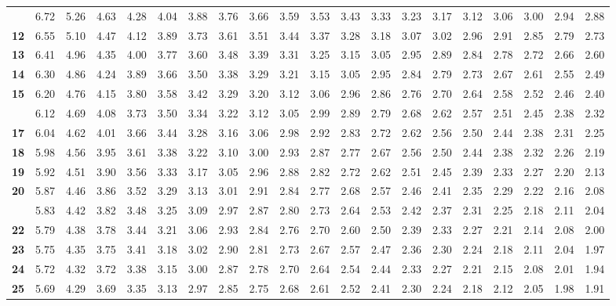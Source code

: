 \documentclass[]{article}
\begin{document}
\begin{landscape}
\begin{longtable}{>{\bfseries}r|rrrrrrrrrrrrrrrrrrr}
\addlinespace
11 & 6.72 & 5.26 & 4.63 & 4.28 & 4.04 & 3.88 & 3.76 & 3.66 & 3.59 & 3.53 & 3.43 & 3.33 & 3.23 & 3.17 & 3.12 & 3.06 & 3.00 & 2.94 & 2.88\\
12 & 6.55 & 5.10 & 4.47 & 4.12 & 3.89 & 3.73 & 3.61 & 3.51 & 3.44 & 3.37 & 3.28 & 3.18 & 3.07 & 3.02 & 2.96 & 2.91 & 2.85 & 2.79 & 2.73\\
13 & 6.41 & 4.96 & 4.35 & 4.00 & 3.77 & 3.60 & 3.48 & 3.39 & 3.31 & 3.25 & 3.15 & 3.05 & 2.95 & 2.89 & 2.84 & 2.78 & 2.72 & 2.66 & 2.60\\
14 & 6.30 & 4.86 & 4.24 & 3.89 & 3.66 & 3.50 & 3.38 & 3.29 & 3.21 & 3.15 & 3.05 & 2.95 & 2.84 & 2.79 & 2.73 & 2.67 & 2.61 & 2.55 & 2.49\\
15 & 6.20 & 4.76 & 4.15 & 3.80 & 3.58 & 3.42 & 3.29 & 3.20 & 3.12 & 3.06 & 2.96 & 2.86 & 2.76 & 2.70 & 2.64 & 2.58 & 2.52 & 2.46 & 2.40\\
\addlinespace
16 & 6.12 & 4.69 & 4.08 & 3.73 & 3.50 & 3.34 & 3.22 & 3.12 & 3.05 & 2.99 & 2.89 & 2.79 & 2.68 & 2.62 & 2.57 & 2.51 & 2.45 & 2.38 & 2.32\\
17 & 6.04 & 4.62 & 4.01 & 3.66 & 3.44 & 3.28 & 3.16 & 3.06 & 2.98 & 2.92 & 2.83 & 2.72 & 2.62 & 2.56 & 2.50 & 2.44 & 2.38 & 2.31 & 2.25\\
18 & 5.98 & 4.56 & 3.95 & 3.61 & 3.38 & 3.22 & 3.10 & 3.00 & 2.93 & 2.87 & 2.77 & 2.67 & 2.56 & 2.50 & 2.44 & 2.38 & 2.32 & 2.26 & 2.19\\
19 & 5.92 & 4.51 & 3.90 & 3.56 & 3.33 & 3.17 & 3.05 & 2.96 & 2.88 & 2.82 & 2.72 & 2.62 & 2.51 & 2.45 & 2.39 & 2.33 & 2.27 & 2.20 & 2.13\\
20 & 5.87 & 4.46 & 3.86 & 3.52 & 3.29 & 3.13 & 3.01 & 2.91 & 2.84 & 2.77 & 2.68 & 2.57 & 2.46 & 2.41 & 2.35 & 2.29 & 2.22 & 2.16 & 2.08\\
\addlinespace
21 & 5.83 & 4.42 & 3.82 & 3.48 & 3.25 & 3.09 & 2.97 & 2.87 & 2.80 & 2.73 & 2.64 & 2.53 & 2.42 & 2.37 & 2.31 & 2.25 & 2.18 & 2.11 & 2.04\\
22 & 5.79 & 4.38 & 3.78 & 3.44 & 3.21 & 3.06 & 2.93 & 2.84 & 2.76 & 2.70 & 2.60 & 2.50 & 2.39 & 2.33 & 2.27 & 2.21 & 2.14 & 2.08 & 2.00\\
23 & 5.75 & 4.35 & 3.75 & 3.41 & 3.18 & 3.02 & 2.90 & 2.81 & 2.73 & 2.67 & 2.57 & 2.47 & 2.36 & 2.30 & 2.24 & 2.18 & 2.11 & 2.04 & 1.97\\
24 & 5.72 & 4.32 & 3.72 & 3.38 & 3.15 & 3.00 & 2.87 & 2.78 & 2.70 & 2.64 & 2.54 & 2.44 & 2.33 & 2.27 & 2.21 & 2.15 & 2.08 & 2.01 & 1.94\\
25 & 5.69 & 4.29 & 3.69 & 3.35 & 3.13 & 2.97 & 2.85 & 2.75 & 2.68 & 2.61 & 2.52 & 2.41 & 2.30 & 2.24 & 2.18 & 2.12 & 2.05 & 1.98 & 1.91\\

\end{longtable}
\end{landscape}
\end{document}
